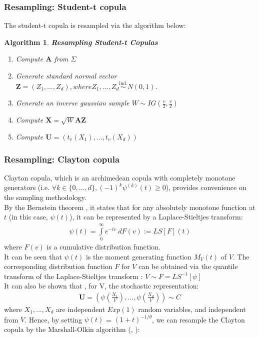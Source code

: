 \documentclass[12pt]{report}
\newtheorem{algorithmold}{Algorithm}[section]
\newcommand{\1}{\mathbf{1}}
\begin{document}
\begin{flushleft}
\subsubsection{Resampling: Student-t copula}
The student-t copula is resampled via the algorithm below:
\begin{algorithmold}\label{tCopulaResampling}
\textit{\normalfont\parencite{HofertBook}}\:
\textbf{Resampling Student-t Copulas}\\
\begin{enumerate}
\item Compute $\textbf{A}$ from $\Sigma$
\item Generate standard normal vector $\textbf{Z} = (Z_{1}, \dots, Z_{d}), where Z_{1}, \dots, Z_{d} \overset{\text{ind.}}{\sim} N(0,1)$.
\item Generate an inverse gaussian sample $W \sim IG \left( \frac{v}{2}, \frac{v}{2} \right)$
\item Compute $\textbf{X} = \sqrt{W}\textbf{AZ}$
\item Compute $\textbf{U} = (t_{v}(X_{1}), \dots, t_{v}(X_{d}))$
\end{enumerate}
\end{algorithmold}
\subsubsection{Resampling: Clayton copula}
Clayton copula, which is an archimedean copula with completely monotone generators (i.e. $\forall k \in \{0, \dots, d \}, (-1)^{k} \psi^{(k)}(t) \ge 0$), provides convenience on the sampling methodology. \\
\vspace{0.5cm}
By the Bernstein theorem \parencite{BernsteinAbsMon1929}, it states that for any absolutely monotone function at $t$ (in this case, $\psi (t)$), it can be represented by a Laplace-Stieltjes transform:
\begin{align*}
\psi (t) = \int\limits_{0}^{\infty} e^{-tv} \: d F(v) := LS[F](t)
\end{align*}
where $F(v)$ is a cumulative distribution function.\\
\vspace{0.5cm}
It can be seen that $\psi (t)$ is the moment generating function $M_{V}(t)$ of $V$. The corresponding distribution function $F$ for $V$ can be obtained via the quantile transform of the Laplace-Stieltjes transform \parencite{HofertBook}: $V \sim F = LS^{-1}[\psi]$\\
\vspace{0.5cm}
It can also be shown that \parencite{HofertBook}, for V, the stochastic representation:
\begin{align*}
\textbf{U} = \left( \psi \left( \frac{X_{1}}{V} \right), \dots, \psi \left( \frac{X_{d}}{V} \right) \right) \sim C
\end{align*}
where $X_{1}, \dots, X_{d}$ are independent $Exp(1)$ random variables, and independent from $V$. Hence, by setting $\psi(t)$ = $(1 + t)^{-1/\theta}$, we can resample the Clayton copula by the Marshall-Olkin algorithm (\cite{MarshallOlkinAlgo1988}, \cite{HofertBook}):


\end{flushleft}
\end{document}
